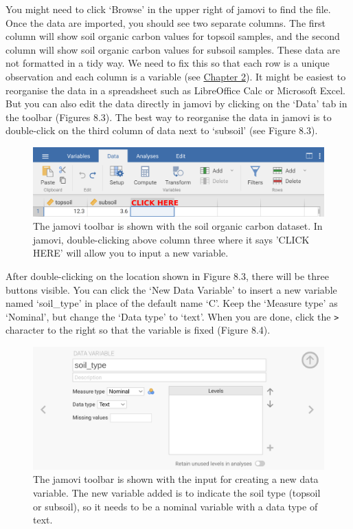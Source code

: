 \documentclass[
  openany]{scrbook}
\begin{document}
You might need to click `Browse' in the upper right of jamovi to find the file.
Once the data are imported, you should see two separate columns.
The first column will show soil organic carbon values for topsoil samples, and the second column will show soil organic carbon values for subsoil samples.
These data are not formatted in a tidy way.
We need to fix this so that each row is a unique observation and each column is a variable (see \protect\hyperlink{Chapter_2}{Chapter 2}).
It might be easiest to reorganise the data in a spreadsheet such as LibreOffice Calc or Microsoft Excel.
But you can also edit the data directly in jamovi by clicking on the `Data' tab in the toolbar (Figures 8.3).
The best way to reorganise the data in jamovi is to double-click on the third column of data next to `subsoil' (see Figure 8.3).

\begin{figure}
\includegraphics[width=1\linewidth]{img/jamovi_new_variable} \caption{The jamovi toolbar is shown with the soil organic carbon dataset. In jamovi, double-clicking above column three where it says 'CLICK HERE' will allow you to input a new variable.}\label{fig:unnamed-chunk-26}
\end{figure}

After double-clicking on the location shown in Figure 8.3, there will be three buttons visible.
You can click the `New Data Variable' to insert a new variable named `soil\_type' in place of the default name `C'.
Keep the `Measure type' as `Nominal', but change the `Data type' to `text'.
When you are done, click the \texttt{\textgreater{}} character to the right so that the variable is fixed (Figure 8.4).

\begin{figure}
\includegraphics[width=1\linewidth]{img/jamovi_set_variable} \caption{The jamovi toolbar is shown with the input for creating a new data variable. The new variable added is to indicate the soil type (topsoil or subsoil), so it needs to be a nominal variable with a data type of text.}\label{fig:unnamed-chunk-27}
\end{figure}
\end{document}
